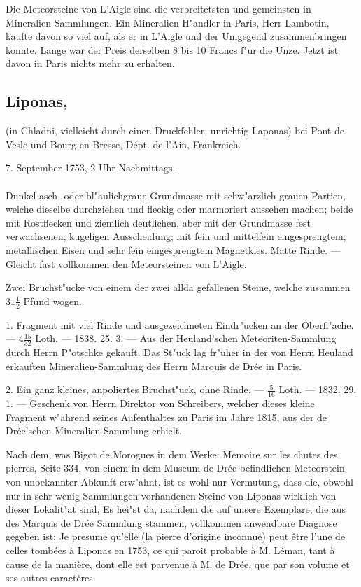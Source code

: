 \documentclass[a4paper, 11pt, oneside, polutonikogreek, german]{article}
\begin{document}
Die Meteorsteine von L’Aigle sind die verbreitetsten und gemeinsten in Mineralien-Sammlungen. Ein Mineralien-H"andler in Paris, Herr Lambotin, kaufte davon so viel auf, als er in L’Aigle und der Umgegend zusammenbringen konnte. Lange war der Preis derselben 8 bis 10 Francs f"ur die Unze. Jetzt ist davon in Paris nichts mehr zu erhalten.
\subsection[Liponas.]{Liponas,}
\begin{center}
\small
(in Chladni, vielleicht durch einen Druckfehler, unrichtig Laponas) bei Pont de Vesle und Bourg en Bresse, Dépt. de l'Ain, Frankreich.

7. September 1753, 2 Uhr Nachmittags.
\end{center}
\paragraph{}
Dunkel asch- oder bl"aulichgraue Grundmasse mit schw"arzlich grauen Partien, welche dieselbe durchziehen und fleckig oder marmoriert aussehen machen; beide mit Rostflecken und ziemlich deutlichen, aber mit der Grundmasse fest verwachsenen, kugeligen Ausscheidung; mit fein und mittelfein eingesprengtem, metallischen Eisen und sehr fein eingesprengtem Magnetkies. Matte Rinde. --- Gleicht fast vollkommen den Meteorsteinen von L'Aigle.

Zwei Bruchst"ucke von einem der zwei allda gefallenen Steine, welche zusammen $31\frac{1}{2}$ Pfund wogen.

1. Fragment mit viel Rinde und ausgezeichneten Eindr"ucken an der Oberfl"ache. --- $4\frac{15}{32}$ Loth. --- 1838. 25. 3. --- Aus der Heuland'schen Meteoriten-Sammlung durch Herrn P"otschke gekauft. Das St"uck lag fr"uher in der von Herrn Heuland erkauften Mineralien-Sammlung des Herrn Marquis de Drée in Paris.

2. Ein ganz kleines, anpoliertes Bruchst"uck, ohne Rinde. --- $\frac{5}{16}$ Loth. --- 1832. 29. 1. --- Geschenk von Herrn Direktor von Schreibers, welcher dieses kleine Fragment w"ahrend seines Aufenthaltes zu Paris im Jahre 1815, aus der de Drée'schen Mineralien-Sammlung erhielt.

Nach dem, was Bigot de Morogues in dem Werke: Memoire sur les chutes des pierres, Seite 334, von einem in dem Museum de Drée befindlichen Meteorstein von unbekannter Abkunft erw"ahnt, ist es wohl nur Vermutung, dass die, obwohl nur in sehr wenig Sammlungen vorhandenen Steine von Liponas wirklich von dieser Lokalit"at sind, Es hei"st da, nachdem die auf unsere Exemplare, die aus des Marquis de Drée Sammlung stammen, vollkommen anwendbare Diagnose gegeben ist: Je presume qu'elle (la pierre d'origine inconnue) peut être l'une de celles tombées à Liponas en 1753, ce qui paroit probable à M. Léman, tant à cause de la manière, dont elle est parvenue à M. de Drée, que par son volume et ses autres caractères.
\end{document}
